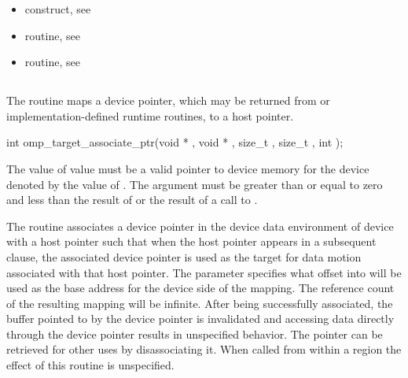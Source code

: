 \crossreferences
\begin{itemize}
\item {} construct, see 

\item {} routine, see 

\item {} routine, see 
\end{itemize}

\subsection{}
\label{subsec:omp_target_associate_ptr}
\summary

The  routine maps a device pointer, which may
be returned from  or implementation-defined runtime 
routines, to a host pointer.

\format
\begin{boxedcode}
int omp\_target\_associate\_ptr(void * , void * ,
                             size\_t , size\_t ,
                             int );
\end{boxedcode}

\pagebreak
{}
\constraints

The value of  value must be a valid pointer to device 
memory for the device denoted by the value of .
The  argument
must be greater than or equal to zero and less than the result of
 or the result of a call to
.

\effect

The  routine associates a device pointer
in the device data environment of device 
with a host pointer such that when the host pointer appears in a subsequent
 clause, the associated device pointer is used as the target for
data motion associated with that host pointer.  The 
parameter specifies what offset into  will be used as the
base address for the device side of the mapping.  The reference count of the
resulting mapping will be infinite.  After being successfully associated, the
buffer pointed to by the device pointer is invalidated and accessing data
directly through the device pointer results in unspecified behavior.  The
pointer can be retrieved for other uses by disassociating it.
When called from within a  region 
the effect of this routine is unspecified.

